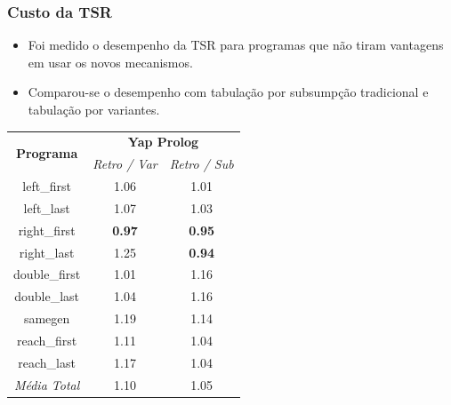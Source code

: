 \documentclass{beamer}
\begin{document}
\begin{frame}
   \frametitle{Custo da TSR}
   \begin{itemize}
      \item Foi medido o desempenho da TSR para programas que não tiram vantagens em usar os novos
      mecanismos.
      \item Comparou-se o desempenho com tabulação por subsumpção tradicional e tabulação por variantes.
   \end{itemize}
   \begin{center}
      {\footnotesize
     \begin{tabular}{ccc}
      \hline
       \hline
       \multirow{2}{*}{\textbf{Programa}} & \multicolumn{2}{c}{\textbf{Yap Prolog}} \\
       & \textit{\small{Retro / Var}} & \textit{\small{Retro / Sub}} \\
      \hline
      \hline
      left\_first & 1.06 & 1.01 \\
      left\_last &  1.07  & 1.03 \\
      right\_first & \textbf{0.97} & \textbf{0.95} \\
      right\_last & 1.25 & \textbf{0.94} \\
      double\_first & 1.01 & 1.16 \\
      double\_last & 1.04 & 1.16 \\
      samegen & 1.19 & 1.14 \\
      reach\_first  &  1.11  & 1.04 \\
      reach\_last  &  1.17  & 1.04 \\
   \hline
   \hline
   \textit{Média Total} &  1.10 &  1.05 \\
   \hline
   \hline
   \end{tabular}}
\end{center}
\end{frame}
\end{document}
